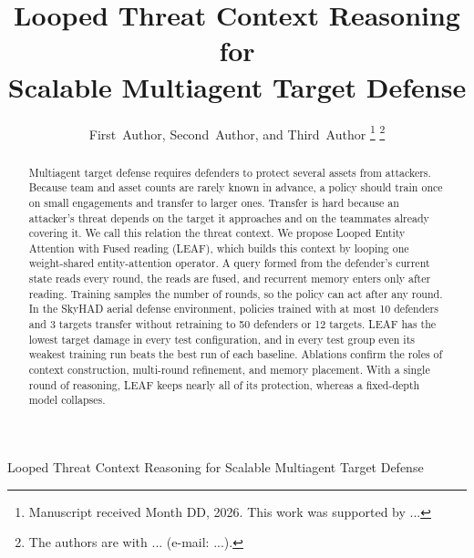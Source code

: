 %   

\title{Looped Threat Context Reasoning for\\ Scalable Multiagent Target Defense}

\author{First~Author, Second~Author, and Third~Author%
\thanks{Manuscript received Month DD, 2026. This work was supported by ...}%
\thanks{The authors are with ... (e-mail: ...).}%
}

%
{Looped Threat Context Reasoning for Scalable Multiagent Target Defense}

\maketitle

\begin{abstract}
Multiagent target defense requires defenders to protect several assets from attackers. Because team and asset counts are rarely known in advance, a policy should train once on small engagements and transfer to larger ones. Transfer is hard because an attacker's threat depends on the target it approaches and on the teammates already covering it. We call this relation the threat context. We propose Looped Entity Attention with Fused reading (LEAF), which builds this context by looping one weight-shared entity-attention operator. A query formed from the defender's current state reads every round, the reads are fused, and recurrent memory enters only after reading. Training samples the number of rounds, so the policy can act after any round. In the SkyHAD aerial defense environment, policies trained with at most 10 defenders and 3 targets transfer without retraining to 50 defenders or 12 targets. LEAF has the lowest target damage in every test configuration, and in every test group even its weakest training run beats the best run of each baseline. Ablations confirm the roles of context construction, multi-round refinement, and memory placement. With a single round of reasoning, LEAF keeps nearly all of its protection, whereas a fixed-depth model collapses.
\end{abstract}

